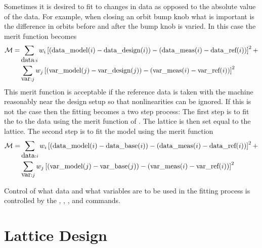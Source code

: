 Sometimes it is desired to fit to changes in data as opposed to the
absolute value of the data. For example, when closing an orbit bump
knob what is important is the difference in orbits before and
after the bump knob is varied. In this case the merit function becomes
\begin{alignat}{1}
  {\cal M} = &\sum_{{\mbox{data}}:i} w_i 
    \left[ ({\mbox{data}}\_{\mbox{model}}(i) - {\mbox{data}}\_{\mbox{design}}(i)) - 
      ({\mbox{data}}\_{\mbox{meas}}(i) - {\mbox{data}}\_{\mbox{ref}}(i)) \right]^2 + \nonumber \\
  &\sum_{{\mbox{var}}:j} w_j 
    \left[ ({\mbox{var}}\_{\mbox{model}}(j) - {\mbox{var}}\_{\mbox{design}}(j)) -
     ({\mbox{var}}\_{\mbox{meas}}(i) - {\mbox{var}}\_{\mbox{ref}}(i)) \right]^2 
  \label{m2}
\end{alignat}
This merit function is acceptable if the reference data is taken with
the machine reasonably near the design setup so that nonlinearities
can be ignored. If this is not the case then the fitting becomes a two
step process: The first step is to fit the  to the 
data using the merit function of . The  lattice is then
set equal to the  lattice. The second
step is to fit the model using the merit function
\begin{alignat}{1}
  {\cal M} = &\sum_{{\mbox{data}}: i} w_i 
    \left[ ({\mbox{data}}\_{\mbox{model}}(i) - {\mbox{data}}\_{\mbox{base}}(i)) - 
      ({\mbox{data}}\_{\mbox{meas}}(i) - {\mbox{data}}\_{\mbox{ref}}(i)) \right]^2 + \nonumber \\
  &\sum_{{\mbox{var}}: j} w_j 
    \left[ ({\mbox{var}}\_{\mbox{model}}(j) - {\mbox{var}}\_{\mbox{base}}(j)) -
     ({\mbox{var}}\_{\mbox{meas}}(i) - {\mbox{var}}\_{\mbox{ref}}(i)) \right]^2 
  \label{m3}
\end{alignat}

Control of what data and what variables are to be used in the fitting
process is controlled by the , , , and
 commands.

\section{Lattice Design}

